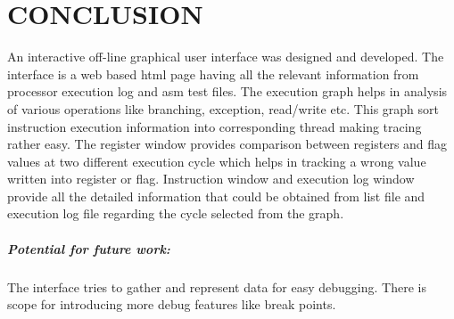 \chapter{CONCLUSION}
\label{chap:GUI_conclusion}

An interactive off-line graphical user interface was designed and developed. The interface is a web based html page having all the relevant information from processor execution log and asm test files. The execution graph  helps in analysis of various operations like branching, exception, read/write etc. This graph sort instruction execution information into corresponding thread making tracing rather easy. The register window provides comparison between registers and flag values at two different execution cycle which helps in tracking a wrong value written into register or flag. Instruction window and execution log window provide all the detailed information that could be obtained from list file and execution log file regarding the cycle selected from the graph. 

\paragraph{Potential for future work:} The interface tries to gather and represent data for easy debugging. There is scope for introducing more debug features like break points.   